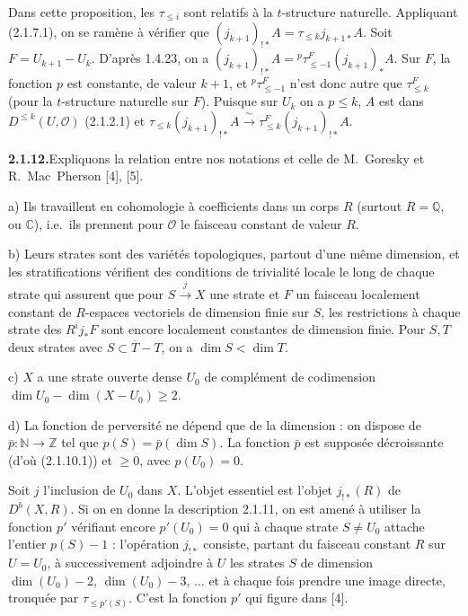 \documentclass[12pt,a4paper]{article}
\theoremstyle{plain}
\theoremstyle{definition}
\begin{document}
Dans cette proposition, les $\tau_{\leqslant i}$ sont relatifs \`a la $t$-structure naturelle. Appliquant (2.1.7.1), on se ram\`ene \`a v\'erifier que $(j_{k+1})_{!*} A = \tau_{\leqslant k} j_{k+1*} A$. Soit $F = U_{k+1} - U_k$. D'apr\`es 1.4.23, on a $(j_{k+1})_{!*} A = {}^p \tau_{\leqslant -1}^F (j_{k+1})_* A$. Sur $F$, la fonction $p$ est constante, de valeur $k+1$, et ${}^p \tau_{\leqslant -1}^F$ n'est donc autre que $\tau_{\leqslant k}^F$ (pour la $t$-structure naturelle sur $F$). Puisque sur $U_k$ on a $p \leqslant k$, $A$ est dans $D^{\leqslant k}(U, \mathcal{O})$ (2.1.2.1) et $\tau_{\leqslant k} (j_{k+1})_{!*} A \xrightarrow{\;\sim\;} \tau_{\leqslant k}^F (j_{k+1})_{!*} A$.

\smallskip
\noindent\textbf{2.1.12.}\quad Expliquons la relation entre nos notations et celle de M.~Goresky et R.~Mac~Pherson [4], [5].

a) Ils travaillent en cohomologie \`a coefficients dans un corps $R$ (surtout $R = \mathbb{Q}$, ou $\mathbb{C}$), i.e.\ ils prennent pour $\mathcal{O}$ le faisceau constant de valeur $R$.

b) Leurs strates sont des vari\'et\'es topologiques, partout d'une m\^eme dimension, et les stratifications v\'erifient des conditions de trivialit\'e locale le long de chaque strate qui assurent que pour $S \xrightarrow{j} X$ une strate et $F$ un faisceau localement constant de $R$-espaces vectoriels de dimension finie sur $S$, les restrictions \`a chaque strate des $R^i j_* F$ sont encore localement constantes de dimension finie. Pour $S, T$ deux strates avec $S \subset \overline{T} - T$, on a $\dim S < \dim T$.

c) $X$ a une strate ouverte dense $U_0$ de compl\'ement de codimension $\dim U_0 - \dim(X - U_0) \geqslant 2$.

d) La fonction de perversit\'e ne d\'epend que de la dimension : on dispose de $\bar{p} : \mathbb{N} \to \mathbb{Z}$ tel que $p(S) = \bar{p}(\dim S)$. La fonction $\bar{p}$ est suppos\'ee d\'ecroissante (d'o\`u (2.1.10.1)) et $\geqslant 0$, avec $p(U_0) = 0$.

Soit $j$ l'inclusion de $U_0$ dans $X$. L'objet essentiel est l'objet $j_{!*}(R)$ de $D^b(X, R)$. Si on en donne la description 2.1.11, on est amen\'e \`a utiliser la fonction $p'$ v\'erifiant encore $p'(U_0) = 0$ qui \`a chaque strate $S \neq U_0$ attache l'entier $p(S) - 1$ : l'op\'eration $j_{!*}$ consiste, partant du faisceau constant $R$ sur $U = U_0$, \`a successivement adjoindre \`a $U$ les strates $S$ de dimension $\dim(U_0) - 2$, $\dim(U_0) - 3$, $\ldots$ et \`a chaque fois prendre une image directe, tronqu\'ee par $\tau_{\leqslant p'(S)}$. C'est la fonction $p'$ qui figure dans [4].
\end{document}
